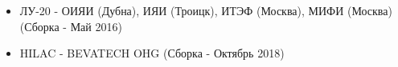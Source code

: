 \documentclass[dvipsnames] {beamer}
\begin{document}
\begin{frame}
\begin{columns}[t]
  \end{columns}
   {\bf \footnotesize 
     \begin{block}{}
       \begin{center}
            \begin{itemize}
            \item {\color{red} ЛУ-20} - ОИЯИ (Дубна), ИЯИ (Троицк), ИТЭФ (Москва), МИФИ (Москва) (Сборка - {\color{blue} Май 2016})
            \item {\color{red} HILAC} - BEVATECH OHG (Сборка - {\color{blue} Октябрь 2018})
            \end{itemize}
       \end{center}
          \end{block}
   }
   \vskip -0.3cm
    \begin{block}{}
       \bf
    \end{block}
\end{frame}
\end{document}
